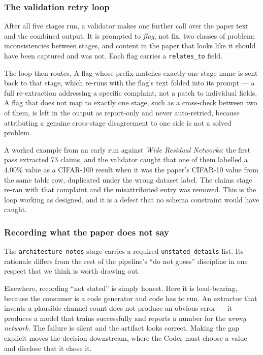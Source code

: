 \documentclass[11pt]{article}
\begin{document}
\subsubsection{The validation retry loop}

After all five stages run, a validator makes one further call over the paper text and the
combined output. It is prompted to \emph{flag}, not fix, two classes of problem:
inconsistencies between stages, and content in the paper that looks like it should have
been captured and was not. Each flag carries a \texttt{relates\_to} field.

The loop then routes. A flag whose prefix matches exactly one stage name is sent back to
that stage, which re-runs with the flag's text folded into its prompt --- a full
re-extraction addressing a specific complaint, not a patch to individual fields. A flag
that does not map to exactly one stage, such as a cross-check between two of them, is
left in the output as report-only and never auto-retried, because attributing a genuine
cross-stage disagreement to one side is not a solved problem.

A worked example from an early run against \emph{Wide Residual Networks}: the first pass
extracted 73 claims, and the validator caught that one of them labelled a 4.00\% value as
a CIFAR-100 result when it was the paper's CIFAR-10 value from the same table row,
duplicated under the wrong dataset label. The claims stage re-ran with that complaint and
the misattributed entry was removed. This is the loop working as designed, and it is a
defect that no schema constraint would have caught.

\subsubsection{Recording what the paper does not say}

The \texttt{architecture\_notes} stage carries a required \texttt{unstated\_details} list.
Its rationale differs from the rest of the pipeline's ``do not guess'' discipline in one
respect that we think is worth drawing out.

Elsewhere, recording ``not stated'' is simply honest. Here it is load-bearing, because the
consumer is a code generator and code has to run. An extractor that invents a plausible
channel count does not produce an obvious error --- it produces a model that trains
successfully and reports a number for the \emph{wrong network}. The failure is silent and
the artifact looks correct. Making the gap explicit moves the decision downstream, where
the Coder must choose a value and disclose that it chose it.
\end{document}
